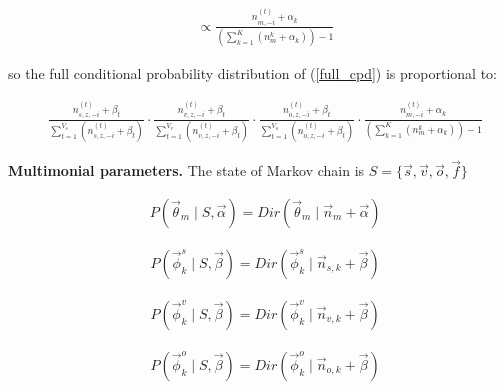 \documentclass{article}
\begin{document}
\begin{equation}
\begin{aligned}
& \propto \frac{n_{m,-i}^{(t)}+\alpha_k}{(\sum_{k=1}^K(n_m^{k}+ \alpha_k)) -1}
\end{aligned}
\end{equation}

so the full conditional probability distribution of (\ref{full_cpd}) is proportional to:

\begin{equation}
\begin{aligned} \label{full}
& \frac{n_{s,z,-i}^{(t)}+\beta_t}{\sum_{t=1}^{V_s}(n_{s,z,-i}^{(t)} + \beta_t)}
\cdot \frac{n_{v,z,-i}^{(t)}+\beta_t}{\sum_{t=1}^{V_v}(n_{v,z,-i}^{(t)} + \beta_t)}
\cdot \frac{n_{o,z,-i}^{(t)}+\beta_t}{\sum_{t=1}^{V_o}(n_{o,z,-i}^{(t)} + \beta_t)}
\cdot \frac{n_{m,-i}^{(t)}+\alpha_k}{(\sum_{k=1}^K(n_m^{k}+ \alpha_k)) -1}
\end{aligned}
\end{equation}

\newpage

\textbf{ Multimonial parameters.}
The state of Markov chain is $S=\{\vec{s}, \vec{v}, \vec{o}, \vec{f}\}$

\begin{equation}
\begin{aligned}
& P(\vec{\theta}_m \mid S, \vec{\alpha}) = Dir(\vec{\theta}_m \mid \vec{n}_m + \vec{\alpha})
\end{aligned}
\end{equation}

\begin{equation}
\begin{aligned}
& P(\vec{\phi}_k^s \mid S, \vec{\beta}) = Dir(\vec{\phi}_k^s \mid \vec{n}_{s,k} + \vec{\beta})
\end{aligned}
\end{equation}

\begin{equation}
\begin{aligned}
& P(\vec{\phi}_k^v \mid S, \vec{\beta}) = Dir(\vec{\phi}_k^v \mid \vec{n}_{v,k} + \vec{\beta})
\end{aligned}
\end{equation}


\begin{equation}
\begin{aligned}
& P(\vec{\phi}_k^o \mid S, \vec{\beta}) = Dir(\vec{\phi}_k^o \mid \vec{n}_{o,k} + \vec{\beta})
\end{aligned}
\end{equation}
\end{document}
